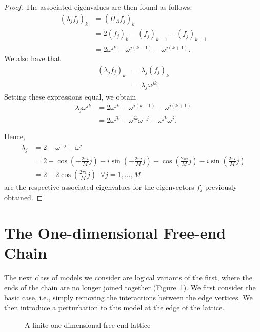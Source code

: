 \documentclass{article}
\newcommand{\hl}{H_\Lambda}
\numberwithin{equation}{section}
\numberwithin{theorem}{section}
\numberwithin{proposition}{section}
\numberwithin{lemma}{section}
\numberwithin{corollary}{section}
\numberwithin{definition}{section}
\begin{document}
\begin{proof}
The associated eigenvalues are then found as follows:
\begin{align*}
	(\lambda_j f_j)_k &= (\hl f_j)_k \\
	&= 2(f_j)_k - (f_j)_{k-1} - (f_j)_{k+1} \\
	&= 2\omega^{jk} - \omega^{j(k-1)} - \omega^{j(k+1)}.
\end{align*}
We also have that
\begin{align*}
	(\lambda_j f_j)_k &= \lambda_j(f_j)_k \\
	&= \lambda_j\omega^{jk}.
\end{align*}
Setting these expressions equal, we obtain
\begin{align*}
	\lambda_j \omega^{jk} &= 2\omega^{jk} - \omega^{j(k-1)} - \omega^{j(k+1)} \\
	&= 2\omega^{jk} - \omega^{jk} \omega^{-j} - \omega^{jk} \omega^{j}.
\end{align*}

Hence,
\begin{align*}
\lambda_j &= 2 - \omega^{-j} - \omega^{j} \\
	  &= 2 - \cos \left( -\frac{2\pi i}{M}j \right) - i \sin \left( - \frac{2\pi i}{M} j \right) - \cos \left(\frac{2\pi i}{M}j \right) - i \sin \left( \frac{2\pi i}{M} j \right) \\
	  &= 2 -2\cos\left(\frac{2\pi i}{M} j\right)  \; \; \forall j = 1, \ldots , M
\end{align*}
are the respective associated eigenvalues for the eigenvectors $f_j$ previously obtained.
\end{proof}

\section{The One-dimensional Free-end Chain}

The next class of models we consider are logical variants of the first, where the ends of the chain are no longer joined together (Figure~\ref{1dchain}). We first consider the basic case, i.e., simply removing the interactions between the edge vertices. We then introduce a perturbation to this model at the edge of the lattice.

	\begin{figure}[h]
		\centering
		\caption{A finite one-dimensional free-end lattice	\label{1dchain}}
	\end{figure}
\end{document}
